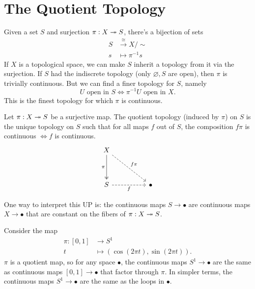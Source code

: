 \documentclass[twoside,10pt]{report}
\begin{document}
\section{The Quotient Topology}

Given a set $S$ and surjection $\pi:X \twoheadrightarrow S$, there's a bijection of sets
\begin{align*}
	S &\stackrel{\cong}{\longrightarrow} X/\sim\\
	s &\mapsto \pi^{-1}s
\end{align*}
If $X$ is a topological space, we can make $S$ inherit a topology from it via the surjection. If $S$ had the indiscrete topology (only $\varnothing,S$ are open), then $\pi$ is trivially continuous. But we can find a finer topology for $S$, namely
\[
U \text{ open in } S \iff \pi^{-1}U \text{ open in } X.
\] This is the finest topology for which $\pi$ is continuous.



\begin{prop}
	Let $\pi: X \twoheadrightarrow S$ be a surjective map. The quotient topology (induced by $\pi$) on $S$ is the unique topology on $S$ such that for all maps $f$ out of $S$, the composition $f\pi$ is continuous $\iff f$ is continuous.
	\[\begin{tikzcd}
	X \\
	\\
	S && \bullet
	\arrow["f\pi", dashed, from=1-1, to=3-3]
	\arrow["\pi"', two heads, from=1-1, to=3-1]
	\arrow["f"', dashed, from=3-1, to=3-3]
\end{tikzcd}\]
\end{prop}

One way to interpret this UP is: the continuous maps $S \to \bullet$ are continuous maps $X \to \bullet$ that are constant on the fibers of $\pi:X\twoheadrightarrow S$.


\begin{ex}[]
Consider the map
\begin{align*}
	\pi: [0,1] &\to S^{1}\\
	t &\mapsto \left( \cos(2\pi t), \sin(2\pi t) \right).
\end{align*}
$\pi$ is a quotient map, so for any space $\bullet$, the continuous maps $S^{1}\to \bullet$ are the same as continuous maps $[0,1]\to \bullet$ that factor through $\pi$. In simpler terms, the continuous maps $S^{1}\to \bullet$ are the same as the loops in $\bullet$.
\end{ex}
\end{document}

